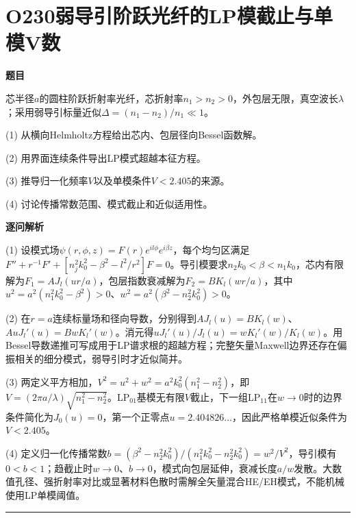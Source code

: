 \documentclass[UTF8,a4paper,11pt,oneside,openany]{ctexbook}
\begin{document}
\section*{O230\quad 弱导引阶跃光纤的LP模截止与单模V数}
\textbf{题目}\par
芯半径$a$的圆柱阶跃折射率光纤，芯折射率$n_1>n_2>0$，外包层无限，真空波长$\lambda$；采用弱导引标量近似$\Delta=(n_1-n_2)/n_1\ll1$。
\par\smallskip\noindent (1) 从横向Helmholtz方程给出芯内、包层径向Bessel函数解。
\par\smallskip\noindent (2) 用界面连续条件导出LP模式超越本征方程。
\par\smallskip\noindent (3) 推导归一化频率$V$以及单模条件$V<2.405$的来源。
\par\smallskip\noindent (4) 讨论传播常数范围、模式截止和近似适用性。
\par\medskip\textbf{逐问解析}\par
\par\smallskip\noindent (1) 设模式场$\psi(r,\phi,z)=F(r)e^{il\phi}e^{i\beta z}$，每个均匀区满足$F''+r^{-1}F'+[n_j^2k_0^2-\beta^2-l^2/r^2]F=0$。导引模要求$n_2k_0<\beta<n_1k_0$，芯内有限解为$F_1=A J_l(ur/a)$，包层指数衰减解为$F_2=B K_l(wr/a)$，其中$u^2=a^2(n_1^2k_0^2-\beta^2)>0$、$w^2=a^2(\beta^2-n_2^2k_0^2)>0$。
\par\smallskip\noindent (2) 在$r=a$连续标量场和径向导数，分别得到$AJ_l(u)=BK_l(w)$、$A uJ_l'(u)=B w K_l'(w)$。消元得$uJ_l'(u)/J_l(u)=wK_l'(w)/K_l(w)$。用Bessel导数递推可写成用于LP谱求根的超越方程；完整矢量Maxwell边界还存在偏振相关的细分模式，弱导引时才近似简并。
\par\smallskip\noindent (3) 两定义平方相加，$V^2=u^2+w^2=a^2k_0^2(n_1^2-n_2^2)$，即$V=(2\pi a/\lambda)\sqrt{n_1^2-n_2^2}$。LP$_{01}$基模无有限$V$截止，下一组LP$_{11}$在$w\to0$时的边界条件简化为$J_0(u)=0$，第一个正零点$u=2.404826\ldots$，因此严格单模近似条件为$V<2.405$。
\par\smallskip\noindent (4) 定义归一化传播常数$b=(\beta^2-n_2^2k_0^2)/(n_1^2k_0^2-n_2^2k_0^2)=w^2/V^2$，导引模有$0<b<1$；趋截止时$w\to0$、$b\to0$，模式向包层延伸，衰减长度$a/w$发散。大数值孔径、强折射率对比或显著材料色散时需解全矢量混合HE/EH模式，不能机械使用LP单模阈值。
\par\medskip\hrule\medskip
\end{document}
